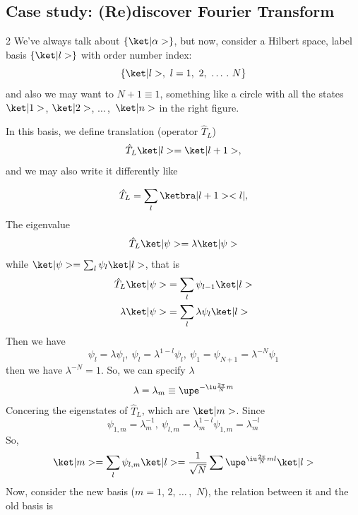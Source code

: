 \subsection{Case study: (Re)discover Fourier Transform}

\begin{paracol}{2}
  We've always talk about $\{\ket|\alpha>\}$, but now,
  consider a Hilbert space, label basis $\{\ket|l>\}$ with order number index:
  \[
    \{\ket|l>,\ l = 1,\ 2,\ \ldots\,.~N\}
  \]
  and also we may want to $N + 1 \equiv 1$,
  something like a circle with all the states
  $\ket|1>$, $\ket|2>$, $\ldots\,$,~$\ket|n>$ in the right figure.

  In this basis, we define translation (operator $\hat T_L$)
  \[\hat T_L\ket|l> = \ket|l + 1>,\]
  and we may also write it differently like
  \switchcolumn \centering
\end{paracol}
\begin{equation}
  \hat T_L = \sum_l \ketbra|l + 1><l|,
\end{equation}
The eigenvalue
\[
  \hat T_L\ket|\psi> = \lambda \ket|\psi>
\]
while $\ket|\psi> = \sum_l \psi_l \ket|l>$, that is
\begin{align*}
  \hat T_L\ket|\psi>  & = \sum_l \psi_{l-1}\ket|l>\\
  \lambda\ket|\psi>   & = \sum_l \lambda \psi_l \ket|l>
\end{align*}
Then we have
\[
  \psi_l = \lambda \psi_l, ~ \psi_l = \lambda^{1-l}\psi_l,~
  \psi_1 = \psi_{N+1} = \lambda^{-N}\psi_1
\]
then we have $\lambda^{-N} = 1$. So, we can specify $\lambda$
\begin{equation}
  \lambda = \lambda_m \equiv \upe^{-\iu \frac{2\pi}Nm}
\end{equation}
Concering the eigenstates of $\hat T_L$, which are $\ket|m>$. Since
\[
  \psi_{1,m} = \lambda_m^{-1}, ~ \psi_{l,m} = \lambda_m^{1-l}\psi_{1,m} = \lambda_m^{-l}
\]
So,
\[
  \ket|m> = \sum_l \psi_{l,m}\ket|l> = \frac1{\sqrt N} \sum\upe^{\iu \frac{2\pi}{N} ml} \ket|l>
\]
Now, consider the new basis ($m = 1$, $2$, $\ldots\,$,~$N$), 
the relation between it and the old basis is
